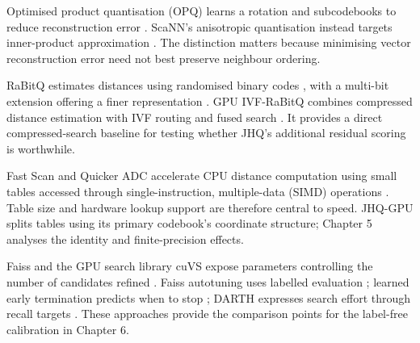 Optimised product quantisation (OPQ) learns a rotation and subcodebooks
to reduce reconstruction error \cite{opq}. ScaNN's anisotropic
quantisation instead targets inner-product approximation \cite{scann}.
The distinction matters because minimising vector reconstruction error
need not best preserve neighbour ordering.

RaBitQ estimates distances using randomised binary codes \cite{rabitq},
with a multi-bit extension offering a finer representation \cite{rabitq_multi}.
GPU IVF-RaBitQ combines compressed distance estimation with IVF routing
and fused search \cite{ivfrabitq}. It provides a direct compressed-search
baseline for testing whether JHQ's additional residual scoring is worthwhile.

Fast Scan and Quicker ADC accelerate CPU distance computation using
small tables accessed through single-instruction, multiple-data (SIMD)
operations \cite{fastscan,quickeradc}. Table size and hardware lookup support are therefore central to speed.
JHQ-GPU splits tables using its primary codebook's coordinate structure;
Chapter 5 analyses the identity and finite-precision effects.

Faiss and the GPU search library cuVS expose parameters controlling the
number of candidates refined \cite{faiss_refine,cuvs_refinement}.
Faiss autotuning uses labelled evaluation \cite{faiss_autotune}; learned
early termination predicts when to stop \cite{li_termination}; DARTH
expresses search effort through recall targets \cite{darth}.
These approaches provide the comparison points for the label-free
calibration in Chapter 6.
